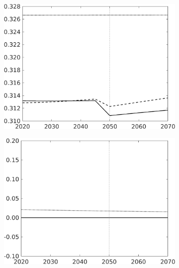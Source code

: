 \begin{figure}[h!!]
\begin{subfigure}[]{0.32\textwidth}
		\end{subfigure}	
		\begin{subfigure}[]{0.32\textwidth}
			\includegraphics[width=1\textwidth]{../../codding_model/own_basedOnFried/optimalPol_010922_revision/figures/all_13Sept22_Tplus30/hl_CompEffOPT_T_NoTaus_regime4_opteff_knspil1_spillover0_noskill0_sep0_xgrowth0_countec0_PV1_etaa0.79_lgd0_lff1.png}
		\end{subfigure}	
		\begin{subfigure}[]{0.32\textwidth}
			\includegraphics[width=1\textwidth]{../../codding_model/own_basedOnFried/optimalPol_010922_revision/figures/all_13Sept22_Tplus30/sff_CompEffOPT_T_NoTaus_regime4_opteff_knspil1_spillover0_noskill0_sep0_xgrowth0_countec0_PV1_etaa0.79_lgd0_lff1.png}

\end{subfigure}
\end{figure}
